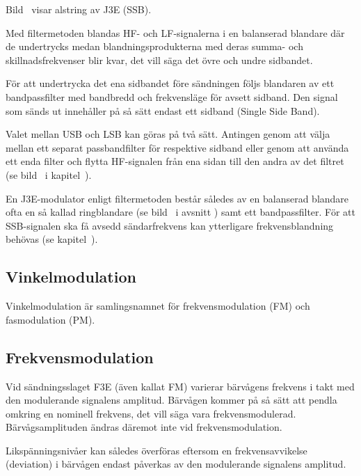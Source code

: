 Bild~ visar alstring av J3E (SSB).

Med filtermetoden blandas HF- och LF-signalerna i en balanserad blandare där de
undertrycks medan blandningsprodukterna med deras summa- och
skillnadsfrekvenser blir kvar, det vill säga det övre och undre sidbandet.

För att undertrycka det ena sidbandet före sändningen följs blandaren
av ett bandpassfilter med bandbredd och frekvensläge för avsett sidband.
Den signal som sänds ut innehåller på så sätt endast ett sidband (Single Side
Band).

Valet mellan USB och LSB kan göras på två sätt.
Antingen genom att välja mellan ett separat passbandfilter för respektive
sidband eller genom att använda ett enda filter och flytta HF-signalen från ena
sidan till den andra av det filtret (se bild~ i
kapitel~).

En J3E-modulator enligt filtermetoden består således av en balanserad blandare
ofta en så kallad ringblandare (se bild~ i avsnitt
) samt ett bandpassfilter.
För att SSB-signalen ska få avsedd sändarfrekvens kan ytterligare
frekvensblandning behövas (se kapitel~).

\subsection{Vinkelmodulation}

Vinkelmodulation är samlingsnamnet för frekvensmodulation (FM) och
fasmodulation (PM).

\subsection{Frekvensmodulation}

Vid sändningsslaget F3E (även kallat FM) varierar bärvågens frekvens i takt med
den modulerande signalens amplitud.
Bärvågen kommer på så sätt att pendla omkring en nominell frekvens, det vill
säga vara frekvensmodulerad.
Bärvågsamplituden ändras däremot inte vid frekvensmodulation.

Likspänningsnivåer kan således överföras eftersom en frekvensavvikelse
(deviation) i bärvågen endast påverkas av den modulerande signalens amplitud.

